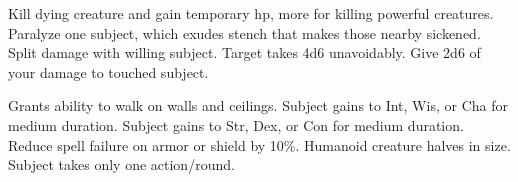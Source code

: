 \begin{swspelllist}
 Kill dying creature and gain temporary hp, more for killing powerful creatures.
 Paralyze one subject, which exudes stench that makes those nearby sickened.
 Split damage with willing subject.
 Target takes 4d6 unavoidably.
 Give 2d6 of your damage to touched subject.

 Grants ability to walk on walls and ceilings.
 Subject gains  to Int, Wis, or Cha for medium duration.
 Subject gains  to Str, Dex, or Con for medium duration.
 Reduce spell failure on armor or shield by 10\%.
 Humanoid creature halves in size.
 Subject takes only one action/round.
\end{swspelllist}

